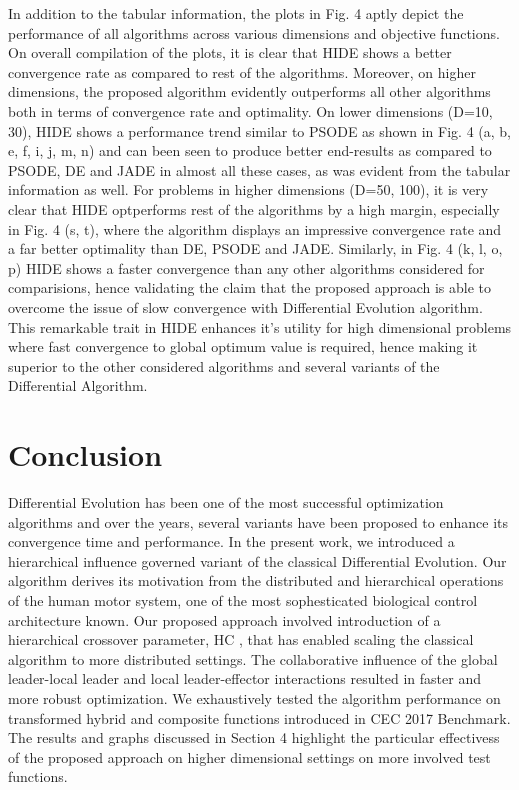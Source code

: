 In addition to the tabular information, the plots in Fig. 4 aptly depict the performance of all algorithms across various dimensions and objective functions.
On overall compilation of the plots, it is clear that HIDE shows a better convergence rate as compared to rest of the algorithms. Moreover, on higher dimensions, the proposed algorithm evidently outperforms all other algorithms both in terms of convergence rate and optimality.
On lower dimensions (D=10, 30), HIDE shows a performance trend similar to PSODE as shown in Fig. 4 (a, b, e, f, i, j, m, n) and can been seen to produce better end-results as compared to PSODE, DE and JADE in almost all these cases, as was evident from the tabular information as well.
For problems in higher dimensions (D=50, 100), it is very clear that HIDE optperforms rest of the algorithms by a high margin, especially in Fig. 4 (s, t), where the algorithm displays an impressive convergence rate and a far better optimality than DE, PSODE and JADE. Similarly, in Fig. 4 (k, l, o, p) HIDE shows a faster convergence than any other algorithms considered for comparisions, hence validating the claim that the proposed approach is able to overcome the issue of slow convergence with Differential Evolution algorithm.
This remarkable trait in HIDE enhances it's utility for high dimensional problems where fast convergence to global optimum value is required, hence making it superior to the other considered algorithms and several variants of the Differential Algorithm.

\section{Conclusion}
%
Differential Evolution has been one of the most successful optimization algorithms and over the years, several variants have been proposed to enhance its convergence time and performance. In the present work, we introduced a hierarchical influence governed variant of the classical Differential Evolution. Our algorithm derives its motivation from the distributed and hierarchical operations of the human motor system, one of the most sophesticated biological control architecture known. Our proposed approach involved introduction of a hierarchical crossover parameter, HC , that has enabled scaling the classical algorithm to more distributed settings. The collaborative influence of the global leader-local leader and local leader-effector interactions resulted in faster and more robust optimization. We exhaustively tested the algorithm performance on transformed hybrid and composite functions introduced in CEC 2017 Benchmark. The results and graphs discussed in Section 4 highlight the particular effectivess of the proposed approach on higher dimensional settings on more involved test functions.

